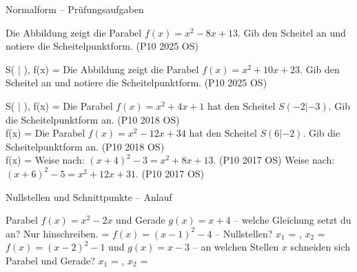 \begin{aufgabe}{Normalform – Prüfungsaufgaben}
\begin{teile}
\teil Die Abbildung zeigt die Parabel $f(x) = x^2 - 8x + 13$. Gib den Scheitel an und notiere die Scheitelpunktform. \hfill (P10 2025 OS) \\

\begin{ksys}[xmin=-1,xmax=7,ymin=-4,ymax=2,ablesen]
\end{ksys}
S( \leerfeld | \leerfeld ), f(x) = \leerfeld
\teil Die Abbildung zeigt die Parabel $f(x) = x^2 + 10x + 23$. Gib den Scheitel an und notiere die Scheitelpunktform. \hfill (P10 2025 OS) \\

\begin{ksys}[xmin=-8,xmax=1,ymin=-3,ymax=3,ablesen]
\end{ksys}
S( \leerfeld | \leerfeld ), f(x) = \leerfeld
\steil Die Parabel $f(x) = x^2 + 4x + 1$ hat den Scheitel $S(-2|{-3})$. Gib die Scheitelpunktform an. \hfill (P10 2018 OS) \\ f(x) = \leerfeld
\steil Die Parabel $f(x) = x^2 - 12x + 34$ hat den Scheitel $S(6|{-2})$. Gib die Scheitelpunktform an. \hfill (P10 2018 OS) \\ f(x) = \leerfeld
\steil Weise nach: $(x + 4)^2 - 3 = x^2 + 8x + 13$. \hfill (P10 2017 OS)
\steil Weise nach: $(x + 6)^2 - 5 = x^2 + 12x + 31$. \hfill (P10 2017 OS)
\end{teile}
\end{aufgabe}

\begin{aufgabe}{Nullstellen und Schnittpunkte – Anlauf}
\begin{teile}
\teil Parabel $f(x) = x^2 - 2x$ und Gerade $g(x) = x + 4$ – welche Gleichung setzt du an? Nur hinschreiben. \leerfeld = \leerfeld
\teil $f(x) = (x - 1)^2 - 4$ – Nullstellen? $x_1$ = \leerfeld , $x_2$ = \leerfeld
\teil $f(x) = (x - 2)^2 - 1$ und $g(x) = x - 3$ – an welchen Stellen $x$ schneiden sich Parabel und Gerade? $x_1$ = \leerfeld , $x_2$ = \leerfeld
\end{teile}
\end{aufgabe}

